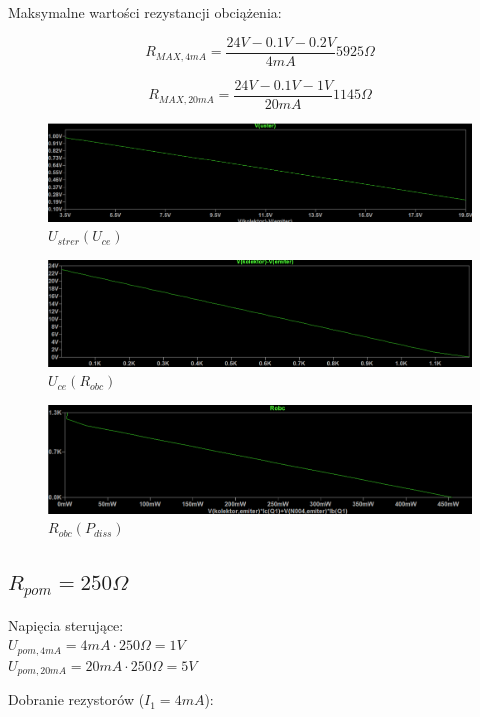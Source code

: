 \documentclass{article}
\begin{document}
Maksymalne wartości rezystancji obciążenia:

$$
    R_{MAX, 4mA}=\frac{24V-0.1V-0.2V}{4mA}5925\Omega
$$

$$
    R_{MAX, 20mA}=\frac{24V-0.1V-1V}{20mA}1145\Omega
$$

\begin{figure}[h!]
    \includegraphics[scale=0.3]{p4.png}
    \centering
    \caption{$U_{strer}(U_{ce})$}
\end{figure}


\begin{figure}[h!]
    \includegraphics[scale=0.3]{p5.png}
    \centering
    \caption{$U_{ce}(R_{obc})$}
\end{figure}

\begin{figure}[h!]
    \includegraphics[scale=0.3]{p6.png}
    \centering
    \caption{$R_{obc}(P_{diss})$}
\end{figure}

\newpage
\subsection{$R_{pom}=250\Omega$}

Napięcia sterujące:\\
$U_{pom, 4mA}=4mA\cdot 250\Omega=1V$\\
$U_{pom, 20mA}=20mA\cdot 250\Omega=5V$


Dobranie rezystorów ($I_{1}=4mA$):
\end{document}
